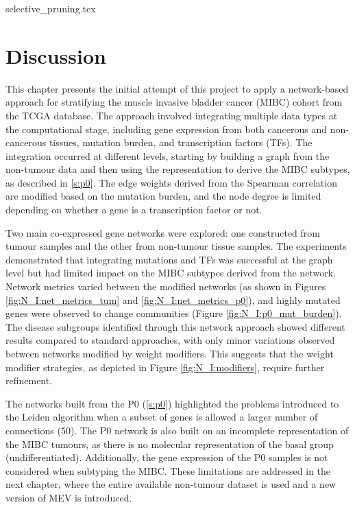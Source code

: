 {selective_pruning.tex}


\section{Discussion}

This chapter presents the initial attempt of this project to apply a network-based approach for stratifying the muscle invasive bladder cancer (MIBC) cohort from the TCGA database. The approach involved integrating multiple data types at the computational stage, including gene expression from both cancerous and non-cancerous tissues, mutation burden, and transcription factors (TFs). The integration occurred at different levels, starting by building a graph from the non-tumour data and then using the representation to derive the MIBC subtypes, as described in \cref{s:p0}. The edge weights derived from the Spearman correlation are modified based on the mutation burden, and the node degree is limited depending on whether a gene is a transcription factor or not.

Two main co-expressed gene networks were explored: one constructed from tumour samples and the other from non-tumour tissue samples. The experiments demonstrated that integrating mutations and TFs was successful at the graph level but had limited impact on the MIBC subtypes derived from the network. Network metrics varied between the modified networks (as shown in Figures \ref{fig:N_I:net_metrics_tum} and \ref{fig:N_I:net_metrics_p0}), and highly mutated genes were observed to change communities (Figure \ref{fig:N_I:p0_mut_burden}). The disease subgroups identified through this network approach showed different results compared to standard approaches, with only minor variations observed between networks modified by weight modifiers. This suggests that the weight modifier strategies, as depicted in Figure \ref{fig:N_I:modifiers}, require further refinement.

The networks built from the P0 (\cref{s:p0}) highlighted the problems introduced to the Leiden algorithm when a subset of genes is allowed a larger number of connections (50). The P0 network is also built on an incomplete representation of the MIBC tumours, as there is no molecular representation of the basal group (undifferentiated). Additionally, the gene expression of the P0 samples is not considered when subtyping the MIBC. These limitations are addressed in the next chapter, where the entire available non-tumour dataset is used and a new version of MEV is introduced.


